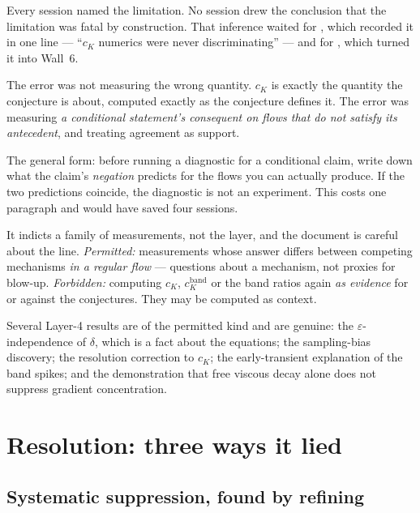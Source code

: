 Every session named the limitation. No session drew the conclusion that the
limitation was fatal by construction. That inference waited for , which
recorded it in one line --- ``\(c_K\) numerics were never discriminating'' ---
and for , which turned it into Wall~6.

\begin{obsv}
\label{obs:conditional-proxy}
The error was not measuring the wrong quantity. \(c_K\) is exactly the
quantity the conjecture is about, computed exactly as the conjecture defines
it. The error was measuring \emph{a conditional statement's consequent on flows
that do not satisfy its antecedent}, and treating agreement as support.

\smallskip
The general form: before running a diagnostic for a conditional claim, write
down what the claim's \emph{negation} predicts for the flows you can actually
produce. If the two predictions coincide, the diagnostic is not an experiment.
This costs one paragraph and would have saved four sessions.
\end{obsv}

\begin{obsv}
\label{obs:wall6-scope}
It indicts a family of measurements, not the layer, and the document is
careful about the line. \emph{Permitted:} measurements whose answer differs
between competing mechanisms \emph{in a regular flow} --- questions about a
mechanism, not proxies for blow-up. \emph{Forbidden:} computing \(c_K\),
\(c_K^{\mathrm{band}}\) or the band ratios again \emph{as evidence} for or
against the conjectures. They may be computed as context.

\smallskip
Several Layer-4 results are of the permitted kind and are genuine: the
\(\varepsilon\)-independence of \(\delta\), which is a fact about the
equations; the sampling-bias discovery; the resolution correction to \(c_K\);
the early-transient explanation of the band spikes; and the demonstration that
free viscous decay alone does not suppress gradient concentration.
\end{obsv}

\section{Resolution: three ways it lied}
\label{sec:resolution}

\subsection{Systematic suppression, found by refining}

